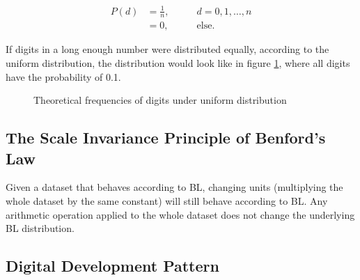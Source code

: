 \begin{equation}
\begin{aligned}
    P(d) &= \frac{1}{n}, &\qquad d=0,1,\dots,n \\
         &= 0,           &\qquad \text{else.}
\end{aligned}
\end{equation}


If digits in a long enough number were distributed equally, according to the uniform distribution, the distribution would look like in figure \ref{fig:BZ-uniform}, where all digits have the probability of 0.1. \cite{kossovsky2014benford, Hronova2023, Marek2024}

\begin{figure}[ht!]
    \centering
    \caption{Theoretical frequencies of digits under uniform distribution}  
    \label{fig:BZ-uniform}
    \pgfplotsset{width=8.5cm,compat=1.18}
\end{figure}

\subsection{The Scale Invariance Principle of Benford's Law}

Given a dataset that behaves according to BL, changing units (multiplying the whole dataset by the same constant) will still behave according to BL. Any arithmetic operation applied to the whole dataset does not change the underlying BL distribution. \cite{kossovsky2014benford, Hronova2023} %

\subsection{Digital Development Pattern} \label{DDPattern}

